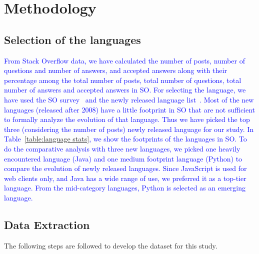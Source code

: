 \section{Methodology}
\label{sec:methodology}
\subsection{Selection of the languages}
\textcolor{blue}{From Stack Overflow data, we have calculated the number of posts, number of questions and number of answers, and accepted answers along with their percentage among the total number of posts, total number of questions, total number of answers and accepted answers in SO. For  selecting the language, we have used the SO survey~\citep{StackoverflowSurvey} and the newly released language list~\citep{wiki:Timeline}. Most of the new languages (released after 2008) have a little footprint in SO that are not sufficient to formally analyze the evolution of that language. Thus we have picked the top three (considering the number of posts) newly released language for our study. In Table~\ref{table:language stats}, we show the footprints of the languages in SO. To do the comparative analysis with three new languages, we picked one heavily encountered language (Java) and one medium footprint language (Python) to compare the evolution of newly released languages. Since JavaScript is used for web clients only, and Java has a wide range of use, we preferred it as a top-tier language. From the mid-category languages, Python is selected as an emerging language.

}
\subsection{Data Extraction}

The following steps are followed to develop the dataset for this study.


